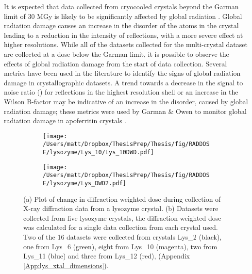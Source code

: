 It is expected that data collected from cryocooled crystals beyond the Garman limit of 30 \si{\mega\gray} is likely to be significantly affected by global radiation \cite{Owen2006}. Global radiation damage causes an increase in the disorder of the atoms in the crystal leading to a reduction in the intensity of reflections, with a more severe effect at higher resolutions. While all of the datasets collected for the multi-crystal dataset are collected at a dose below the Garman limit, it is possible to observe the effects of global radiation damage from the start of data collection. Several metrics have been used in the literature to identify the signs of global radiation damage in crystallographic datasets. A trend towards a decrease in the signal to noise ratio () for reflections in the highest resolution shell or an increase in the Wilson B-factor may be indicative of an increase in the disorder, caused by global radiation damage; these metrics were used by Garman \& Owen to monitor global radiation damage in apoferritin crystals \cite{Garman2006}.   
\begin{figure}[!htbp]
\centering
\begin{subfigure}{.5\textwidth}
  \centering
  \texttt{[image: /Users/matt/Dropbox/ThesisPrep/Thesis/fig/RADDOSE/lysozyme/Lys\_10/Lys\_10DWD.pdf]}
  \caption{}
  \label{fig:Lys_DWD}
\end{subfigure}%
\begin{subfigure}{.5\textwidth}
  \centering
  \texttt{[image: /Users/matt/Dropbox/ThesisPrep/Thesis/fig/RADDOSE/lysozyme/Lys\_DWD2.pdf]}
  \caption{}
  \label{fig:Lys_DoseVar}
\end{subfigure}
\caption[Rate of X-ray Absorption by Lysozyme Crystals]{(a) Plot of change in diffraction weighted dose during collection of X-ray diffraction data from a lysozyme crystal. (b) Datasets were collected from five lysozyme crystals, the diffraction weighted dose was calculated for a single data collection from each crystal used. Two of the 16 datasets were collected from crystals Lys\_2 (black), one from Lys\_6 (green), eight from Lys\_10 (magenta), two from Lys\_11 (blue) and three from Lys\_12 (red), (Appendix \ref{App:lys_xtal_dimensions}).}
\end{figure}



